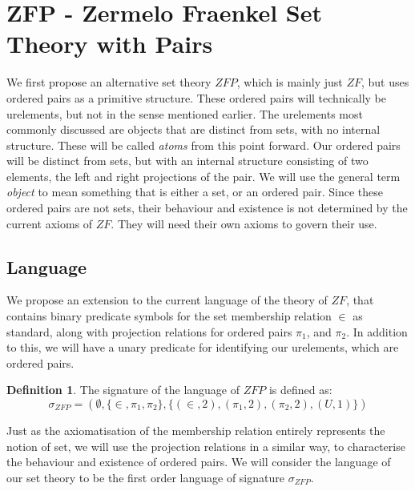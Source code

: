 \documentclass[11pt]{article}
\newcommand{\pleft}{\mathrel{\pi_1}}
\newcommand{\pright}{\mathrel{\pi_2}}
\theoremstyle{definition}
\theoremstyle{theorem}
\theoremstyle{lemma}
\newtheorem{definition}{Definition}[section]
\begin{document}
\section{ZFP - Zermelo Fraenkel Set Theory with Pairs}
We first propose an alternative set theory $\mathit{ZFP}$, which is mainly just $\mathit{ZF}$, but uses ordered pairs as a primitive structure.
These ordered pairs will technically be urelements, but not in the sense mentioned earlier.
The urelements most commonly discussed are objects that are distinct from sets, with no internal structure.
These will be called \emph{atoms} from this point forward.
Our ordered pairs will be distinct from sets, but with an internal structure consisting of two elements, the left and right projections of the pair.
We will use the general term \emph{object} to mean something that is either a set, or an ordered pair.
Since these ordered pairs are not sets, their behaviour and existence is not determined by the current axioms of $\mathit{ZF}$.
They will need their own axioms to govern their use.

\subsection{Language}
We propose an extension to the current language of the theory of $\mathit{ZF}$, that contains binary predicate symbols for the set membership relation $\in$ as standard, along with projection relations for ordered pairs $\pleft$, and $\pright$.
In addition to this, we will have a unary predicate for identifying our urelements, which are ordered pairs.
\begin{definition}
The signature of the language of $\mathit{ZFP}$ is defined as:
$$\sigma_\mathit{ZFP} = (\emptyset,\{\in, \pleft, \pright\},\{(\in,2),(\pleft,2),(\pright,2),(\mathit{U},1)\})$$
\end{definition}
\noindent
Just as the axiomatisation of the membership relation entirely represents the notion of set, we will use the projection relations in a similar way, to characterise the behaviour and existence of ordered pairs.
We will consider the language of our set theory to be the first order language of signature $\sigma_\mathit{ZFP}$.
\end{document}
